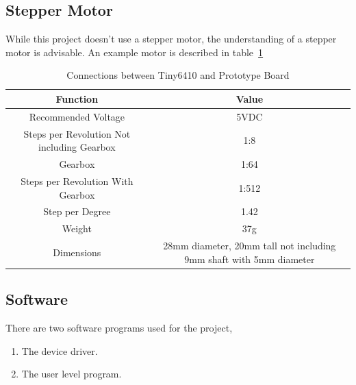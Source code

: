 \documentclass[10pt,conference]{IEEEtran}
\begin{document}
\subsection{Stepper Motor}\label{SS:StepperMotor}
While this project doesn't use a stepper motor, the understanding of a stepper motor is advisable. An example motor is described in table~\ref{T:stepper_motor} \cite{StepperMotor}

\begin{table}[h]
\begin{tabular}{ | c | c | }
	\hline
	\textbf{Function} & \textbf{Value} \\ \hline
	Recommended Voltage & 5VDC \\ \hline
	Steps per Revolution Not including Gearbox & 1:8 \\ \hline
	Gearbox & 1:64 \\ \hline
	Steps per Revolution With Gearbox & 1:512 \\ \hline
	Step per Degree & 1.42 \\ \hline
	Weight & 37g \\ \hline
	Dimensions & 28mm diameter, 20mm tall not including 9mm shaft with 5mm diameter \\ \hline
\end{tabular}
\caption{Connections between Tiny6410 and Prototype Board}\label{T:stepper_motor}
\end{table}


\subsection{Software}\label{Software}
There are two software programs used for the project,
\begin{enumerate}
	\item The device driver.
	\item The user level program.
\end{enumerate}
\end{document}
